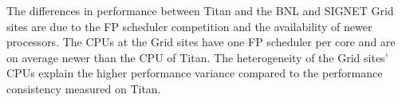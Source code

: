 The differences in performance between Titan and the BNL and SIGNET Grid sites
are due to the FP scheduler competition and the availability of newer
processors. The CPUs at the Grid sites have one FP scheduler per core and are on
average newer than the CPU of Titan. The heterogeneity of the Grid sites' CPUs
explain the higher performance variance compared to the performance consistency
measured on Titan.

%
%
%
%
%

